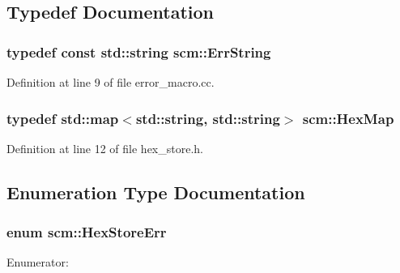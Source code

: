 \subsection{Typedef Documentation}
\hypertarget{namespacescm_a13a6ecf77ceb7b5b3a38e0fada54aa99}{
\subsubsection[{ErrString}]{\setlength{\rightskip}{0pt plus 5cm}typedef const std::string {\bf scm::ErrString}}}
\label{namespacescm_a13a6ecf77ceb7b5b3a38e0fada54aa99}


Definition at line 9 of file error\_\-macro.cc.

\hypertarget{namespacescm_a4d40b517d9d5d1165028e138a05ef06d}{
\subsubsection[{HexMap}]{\setlength{\rightskip}{0pt plus 5cm}typedef std::map$<$std::string, std::string$>$ {\bf scm::HexMap}}}
\label{namespacescm_a4d40b517d9d5d1165028e138a05ef06d}


Definition at line 12 of file hex\_\-store.h.



\subsection{Enumeration Type Documentation}
\hypertarget{namespacescm_a705760e217d94addc2f8f8102f624d61}{
\subsubsection[{HexStoreErr}]{\setlength{\rightskip}{0pt plus 5cm}enum {\bf scm::HexStoreErr}}}
\label{namespacescm_a705760e217d94addc2f8f8102f624d61}
\begin{Desc}
\item[Enumerator: ]\par
\begin{description}
\item[{\em 
\hypertarget{namespacescm_a705760e217d94addc2f8f8102f624d61a646922e14c685ecf838b9a5f8621ef55}{
HEXSTORE\_\-OK}
\label{namespacescm_a705760e217d94addc2f8f8102f624d61a646922e14c685ecf838b9a5f8621ef55}
}]\item[{\em 
\hypertarget{namespacescm_a705760e217d94addc2f8f8102f624d61a723d79af0e48a083e3dd825655a3ddc2}{
HEXSTORE\_\-KEY\_\-ERROR}
\label{namespacescm_a705760e217d94addc2f8f8102f624d61a723d79af0e48a083e3dd825655a3ddc2}
}]\end{description}
\end{Desc}



